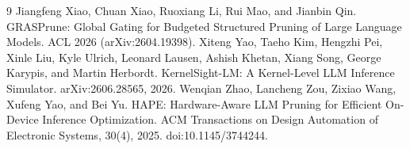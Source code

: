 \documentclass[10pt,letterpaper,twocolumn]{article}
\begin{document}
\begin{thebibliography}{9}
Jiangfeng Xiao, Chuan Xiao, Ruoxiang Li, Rui Mao, and Jianbin
Qin. GRASPrune: Global Gating
for Budgeted Structured Pruning of Large Language Models.
ACL 2026 (arXiv:2604.19398).
 Xiteng Yao, Taeho Kim,
Hengzhi Pei, Xinle Liu, Kyle Ulrich, Leonard Lausen, Ashish
Khetan, Xiang Song, George Karypis, and Martin Herbordt.
KernelSight-LM: A
Kernel-Level LLM Inference Simulator. arXiv:2606.28565, 2026.
 Wenqian Zhao, Lancheng Zou,
Zixiao Wang, Xufeng Yao, and Bei Yu. HAPE: Hardware-Aware LLM Pruning
for Efficient On-Device Inference Optimization. ACM Transactions
on Design Automation of Electronic Systems, 30(4), 2025.
doi:10.1145/3744244.
\end{thebibliography}
\end{document}

